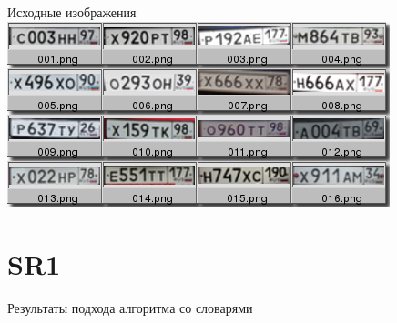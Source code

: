 
%
%
%

\begin{frame}{Исходные изображения}
  \includegraphics[width=\columnwidth]{content/out_sr1.png}
\end{frame}

\section{SR1}
\begin{frame}{Результаты подхода алгоритма со словарями}
  
\end{frame}


